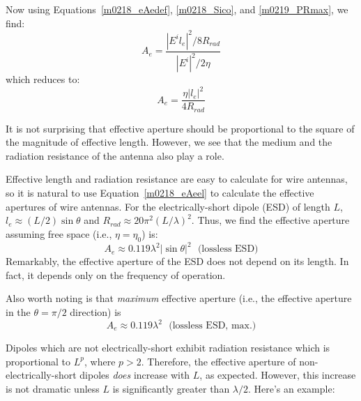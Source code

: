 Now using Equations~\ref{m0218_eAedef}, \ref{m0218_Sico}, and \ref{m0219_PRmax}, we find:
%
\begin{equation}
A_e = \frac{\left|E^i l_e \right|^2 / 8R_{rad} }{ \left|E^i\right|^2 / 2\eta  } 
\end{equation}
%
which reduces to:
%
\begin{equation}
\boxed{
A_e = \frac{ \eta \left|l_e\right|^2 }{ 4 R_{rad} } 
}
\label{m0218_eAeel}
\end{equation}

It is not surprising that effective aperture should be proportional to the square of the magnitude of effective length.
However, we see that the medium and the radiation resistance of the antenna also play a role.


Effective length and radiation resistance are easy to calculate for wire antennas, so it is natural to use Equation~\ref{m0218_eAeel} to calculate the effective apertures of wire antennas.
For the electrically-short dipole (ESD)
of length $L$, $l_e\approx(L/2)\sin\theta$ and $R_{rad} \approx 20\pi^2\left(L/\lambda\right)^2$.
Thus, we find the effective aperture assuming free space (i.e., $\eta=\eta_0$) is:
%
\begin{equation}
A_e \approx 0.119\lambda^2 \left|\sin\theta\right|^2 ~~~\mbox{(lossless ESD)}
\end{equation}
%
Remarkably, the effective aperture of the ESD does not depend on its length.
In fact, it depends only on the frequency of operation.

Also worth noting is that \emph{maximum} effective aperture (i.e., the effective aperture in the $\theta=\pi/2$ direction) is
%
\begin{equation}
\boxed{ A_e \approx 0.119\lambda^2 } ~~~\mbox{(lossless ESD, max.)}
\end{equation}

Dipoles which are not electrically-short exhibit radiation resistance which is proportional to $L^p$, where $p>2$.
Therefore, the effective aperture of non-electrically-short dipoles \emph{does} increase with $L$, as expected.
However, this increase is not dramatic unless $L$ is significantly greater than $\lambda/2$.
Here's an example:

